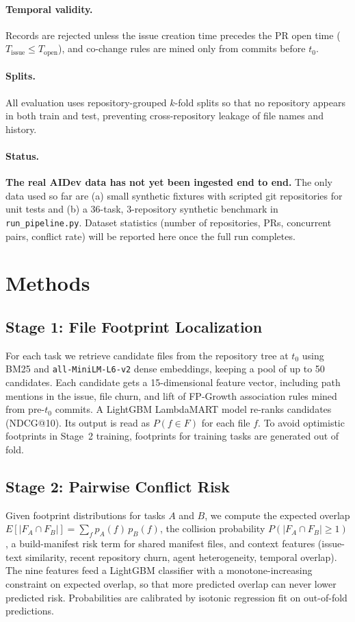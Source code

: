 \documentclass[sigconf, authorversion, nonacm]{acmart}
\begin{document}
\paragraph{Temporal validity.} Records are rejected unless the issue creation time precedes the PR open time ($T_{\text{issue}} \le T_{\text{open}}$), and co-change rules are mined only from commits before $t_0$.

\paragraph{Splits.} All evaluation uses repository-grouped $k$-fold splits so that no repository appears in both train and test, preventing cross-repository leakage of file names and history.

\paragraph{Status.} \textbf{The real AIDev data has not yet been ingested end to end.} The only data used so far are (a) small synthetic fixtures with scripted git repositories for unit tests and (b) a 36-task, 3-repository synthetic benchmark in \texttt{run\_pipeline.py}. Dataset statistics (number of repositories, PRs, concurrent pairs, conflict rate) will be reported here once the full run completes.

\section{Methods}
\subsection{Stage 1: File Footprint Localization}
For each task we retrieve candidate files from the repository tree at $t_0$ using BM25 and \texttt{all-MiniLM-L6-v2} dense embeddings, keeping a pool of up to 50 candidates. Each candidate gets a 15-dimensional feature vector, including path mentions in the issue, file churn, and lift of FP-Growth association rules mined from pre-$t_0$ commits. A LightGBM LambdaMART model re-ranks candidates (NDCG@10). Its output is read as $P(f \in F)$ for each file $f$. To avoid optimistic footprints in Stage~2 training, footprints for training tasks are generated out of fold.

\subsection{Stage 2: Pairwise Conflict Risk}
Given footprint distributions for tasks $A$ and $B$, we compute the expected overlap $E[|F_A\cap F_B|]=\sum_f p_A(f)\,p_B(f)$, the collision probability $P(|F_A\cap F_B|\ge 1)$, a build-manifest risk term for shared manifest files, and context features (issue-text similarity, recent repository churn, agent heterogeneity, temporal overlap). The nine features feed a LightGBM classifier with a monotone-increasing constraint on expected overlap, so that more predicted overlap can never lower predicted risk. Probabilities are calibrated by isotonic regression fit on out-of-fold predictions.
\end{document}
